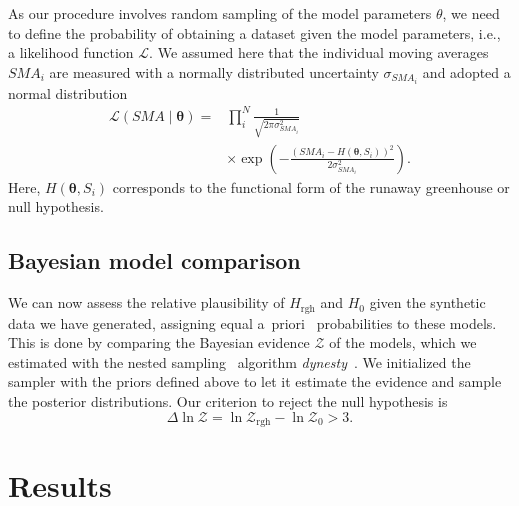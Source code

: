 \documentclass[twocolumn,twocolappendix]{aastex631}
\begin{document}
As our procedure involves random sampling of the model parameters $\theta$, we need to define the probability of obtaining a dataset given the model parameters, i.e., a likelihood function $\mathcal{L}$.
We assumed here that the individual moving averages $SMA_i$ are measured with a normally distributed uncertainty $\sigma_{SMA_i}$ and adopted a normal distribution
\begin{eqnarray}
    \mathcal{L}(SMA \mid \boldsymbol{\theta})= & \prod_{i}^{N} \frac{1}{\sqrt{2 \pi \sigma_{SMA_i}^{2}}} \\
    & \times \exp \left(-\frac{\left(SMA_i - H\left(\boldsymbol{\theta}, S_i\right)\right)^{2}}{2 \sigma_{SMA_i}^{2}}\right).
\end{eqnarray}
Here, $H\left(\boldsymbol{\theta}, S_i\right)$ corresponds to the functional form of the runaway greenhouse or null hypothesis.


\subsection{Bayesian model comparison}
We can now assess the relative plausibility of $H_{\mathrm{rgh}}$ and $H_0$ given the synthetic data we have generated, assigning equal a~priori~ probabilities to these models.
This is done by comparing the Bayesian evidence $\mathcal{Z}$ of the models, which we estimated with the nested sampling~\citep{Skilling2004} algorithm \emph{dynesty}~\citep{Speagle2020}.
We initialized the sampler with the priors defined above to let it estimate the evidence and sample the posterior distributions.
Our criterion to reject the null hypothesis is
\begin{equation}
\Delta \ln \mathcal{Z}  = \ln \mathcal{Z}_\mathrm{rgh} - \ln \mathcal{Z}_0  > 3.
\end{equation}



\section{Results}\label{sec:results}
\end{document}

